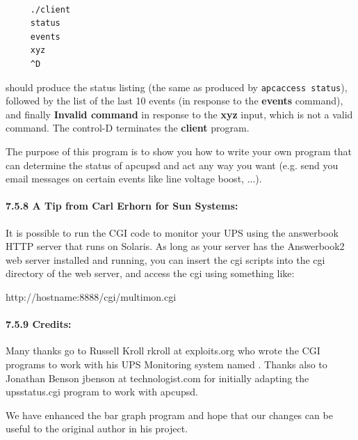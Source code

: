 {{{{{{{{\footnotesize
\begin{verbatim}
     
     ./client
     status
     events
     xyz
     ^D
\end{verbatim}
\normalsize

should produce the status listing (the same as produced by {\tt apcaccess
status}), followed by the list of the last 10 events (in response to the {\bf
events} command), and finally {\bf Invalid command} in response to the {\bf
xyz} input, which is not a valid command. The control-D terminates the {\bf
client} program.  

The purpose of this program is to show you how to write your own program that
can determine the status of apcupsd and act any way you want (e.g. send you
email messages on certain events like line voltage boost, ...). 

\label{A-Tip-from-Carl-Erhorn-for-Sun-Systems}

\paragraph*{7.5.8 A Tip from Carl Erhorn for Sun Systems:}

\label{index-Tip-137}
It is possible to run the CGI code to monitor your UPS using the answerbook
HTTP server that runs on Solaris. As long as your server has the Answerbook2
web server installed and running, you can insert the cgi scripts into the cgi
directory of the web server, and access the cgi using something like:  

http://hostname:8888/cgi/multimon.cgi 

\label{Credits}

\paragraph*{7.5.9 Credits:}

Many thanks go to Russell Kroll \lt{}rkroll at exploits.org\gt{} who wrote the
CGI programs to work with his UPS Monitoring system named 
. Thanks also to
Jonathan Benson \lt{}jbenson at technologist.com\gt{} for initially adapting
the upsstatus.cgi program to work with apcupsd.  

We have enhanced the bar graph program and hope that our changes can be useful
to the original author in his project. 

\label{Security-Issues}

}}}}}}}}
